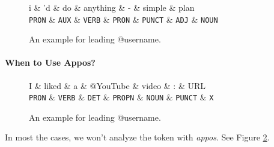 \documentclass[11pt,a4paper]{article}
\begin{document}
\begin{figure}[t]
	\centering
	\small
	\begin{dependency}[edge slant=2, text only label, label style=above]
		\begin{deptext}
			i \& 'd \& do \& anything \& - \& simple \& plan \\
			\texttt{PRON} \& \texttt{AUX} \& \texttt{VERB} \& \texttt{PRON} \& \texttt{PUNCT} \& \texttt{ADJ} \& \texttt{NOUN} \\
		\end{deptext}
	\end{dependency}
	\caption{An example for leading @username.}\label{fig:title-singer}
\end{figure}

\paragraph{When to Use Appos?}
\begin{figure}[t]
	\centering
	\small
	\begin{dependency}[edge slant=2, text only label, label style=above]
		\begin{deptext}
			I \& liked \& a \& @YouTube \& video \& : \& URL \\
			\texttt{PRON} \& \texttt{VERB} \& \texttt{DET} \& \texttt{PROPN} \& \texttt{NOUN} \& \texttt{PUNCT} \& \texttt{X} \\
		\end{deptext}
	\end{dependency}
	\caption{An example for leading @username.}\label{fig:case-02}
\end{figure}

In most the cases, we won't analyze the token with \textit{appos}.
See Figure \ref{fig:case-02}.
\end{document}
